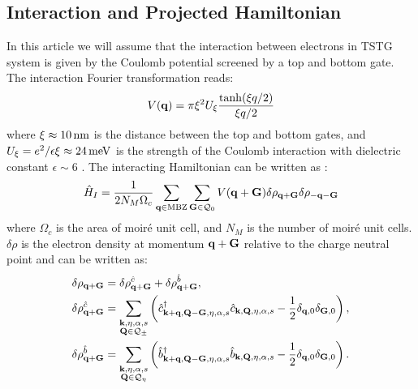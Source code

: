 \documentclass[prb,aps,nofootinbib,amssymb,twocolumn,superscriptaddress,10pt]{revtex4-2}
\begin{document}
\subsection{Interaction and Projected Hamiltonian}
In this article we will assume that the interaction between electrons in TSTG system is given by the Coulomb potential screened by a top and bottom gate. The interaction Fourier transformation reads:
\begin{equation}\label{eq:Vq}
	V(\mathbf{q}) = \pi\xi^2U_\xi\frac{\tanh(\xi q/2)}{\xi q/2}
\end{equation}
where $\xi \approx 10\,\rm nm$ is the distance between the top and bottom gates, and $U_\xi = e^2/\epsilon\xi \approx 24\,\rm meV$ is the strength of the Coulomb interaction with dielectric constant $\epsilon\sim 6$ \cite{CAO18,CAO18a,KAN18}. The interacting Hamiltonian can be written as \cite{KAN19,BER20a,TSTGI}:
\begin{equation}
	\hat{H}_I = \frac{1}{2N_M\Omega_c} \sum_{\mathbf{q}\in{\rm MBZ}}\sum_{\mathbf{G}\in\mathcal{Q}_0}V(\mathbf{q} + \mathbf{G}) \delta\rho_{\mathbf{q} + \mathbf{G}} \delta\rho_{-\mathbf{q} - \mathbf{G}}
\end{equation}
where $\Omega_c$ is the area of moir\'e unit cell, and $N_M$ is the number of moir\'e unit cells. $\delta\rho$ is the electron density at momentum $\mathbf{q} + \mathbf{G}$ relative to the charge neutral point and can be written as:
\begin{align}
	\delta\rho_{\mathbf{q} + \mathbf{G}} &= \delta\rho^{\hat{c}}_{\mathbf{q} + \mathbf{G}} + \delta\rho^{\hat{b}}_{\mathbf{q} + \mathbf{G}},\\
	\delta\rho^{\hat{c}}_{\mathbf{q} + \mathbf{G}} &= \sum_{\substack{\mathbf{k},\eta, \alpha, s \\ \mathbf{Q}\in\mathcal{Q}_\pm}}\left(\hat{c}^\dagger_{\mathbf{k}+\mathbf{q},\mathbf{Q}-\mathbf{G},\eta,\alpha,s} \hat{c}_{\mathbf{k},\mathbf{Q},\eta,\alpha,s} - \frac12 \delta_{\mathbf{q}, 0}\delta_{\mathbf{G},0}\right),\\
	\delta\rho^{\hat{b}}_{\mathbf{q} + \mathbf{G}} &= \sum_{\substack{\mathbf{k},\eta, \alpha, s \\ \mathbf{Q}\in\mathcal{Q}_\eta}}\left(\hat{b}^\dagger_{\mathbf{k}+\mathbf{q},\mathbf{Q}-\mathbf{G},\eta,\alpha,s} \hat{b}_{\mathbf{k},\mathbf{Q},\eta,\alpha,s} - \frac12 \delta_{\mathbf{q}, 0}\delta_{\mathbf{G},0}\right).
\end{align}
\end{document}
